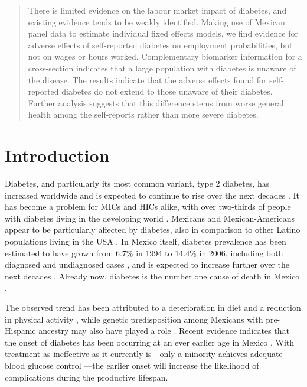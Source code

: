 
\begin{abstract}
There is limited evidence on the labour market impact of diabetes, and existing evidence tends to be weakly identified. Making use of Mexican panel data to estimate individual fixed effects models, we find evidence for adverse effects of self-reported diabetes on employment probabilities, but not on wages or hours worked. Complementary biomarker information for a cross-section indicates that a large population with diabetes is unaware of the disease. The results indicate that the adverse effects found for self-reported diabetes do not extend to those unaware of their diabetes. Further analysis suggests that this difference stems from worse general health among the self-reports rather than more severe diabetes.
\end{abstract}



\section{\label{sec:Introduction4}Introduction }

Diabetes, and particularly its most common variant, type 2 diabetes, has increased worldwide and is expected to continue to rise over the next decades \parencite{Risk2016}. It has become a problem for \acfp{MIC} and \acfp{HIC} alike, with over two-thirds of people with diabetes living in the developing world \parencite{InternationalDiabetesFederation2013}. Mexicans and Mexican-Americans appear to be particularly affected by diabetes, also in comparison to other Latino populations living in the USA \parencite{Schneiderman2014}. In Mexico itself, diabetes prevalence has been estimated to have grown from 6.7\% in 1994 to 14.4\% in 2006, including both diagnosed and undiagnosed cases \parencite{Barquera2013}, and is expected to increase further over the next decades \parencite{Meza2015}. Already now, diabetes is the number one cause of death in Mexico \parencite{Barquera2013}. 

The observed trend has been attributed to a deterioration in diet and a reduction in physical activity \parencite{Barquera2008b,Basu2013}, while genetic predisposition among Mexicans with pre-Hispanic ancestry may also have played a role \parencite{Williams2013}. Recent evidence indicates that the onset of diabetes has been occurring at an ever earlier age in Mexico \parencite{Villalpando2010}. With treatment as ineffective as it currently is---only a minority achieves adequate blood glucose control \parencite{Barquera2013}---the earlier onset will increase the likelihood of complications during the productive lifespan. 

